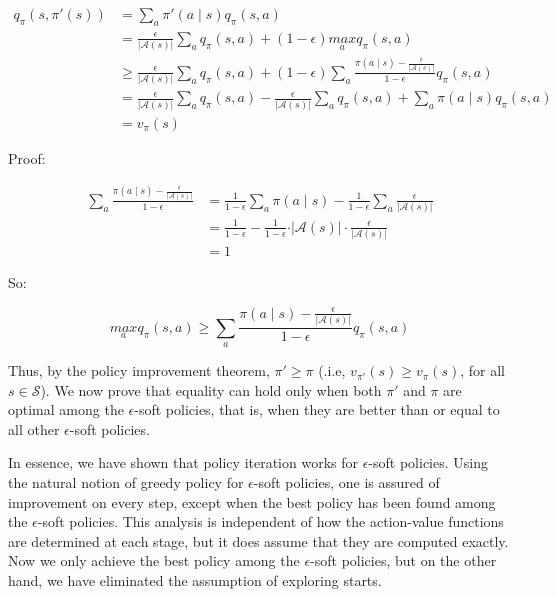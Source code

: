 \documentclass{article}
\begin{document}
\begin{equation*}
\begin{split}
q_{\pi}(s, \pi'(s))
& = \sum_{a} \pi'(a \mid s) q_{\pi}(s, a) \\
& = \frac{\epsilon}{\vert \mathcal{A}(s) \vert} \sum_{a} q_{\pi}(s, a) + (1 - \epsilon) \underset{a}{max} q_{\pi}(s, a) \\
& \geq \frac{\epsilon}{\vert \mathcal{A}(s) \vert} \sum_{a} q_{\pi}(s, a) + (1 - \epsilon) \sum_{a} \frac{\pi(a \mid s) - \frac{\epsilon}{\vert \mathcal{A}(s) \vert}}{1 - \epsilon} q_{\pi}(s, a) \\
& = \frac{\epsilon}{\vert \mathcal{A}(s) \vert} \sum_{a} q_{\pi}(s, a) -  \frac{\epsilon}{\vert \mathcal{A}(s) \vert} \sum_{a} q_{\pi}(s, a) + \sum_{a} \pi(a \mid s) q_{\pi}(s, a) \\
& = v_{\pi}(s)
\end{split}
\end{equation*}

Proof:

\begin{equation*}
\begin{split}
\sum_{a} \frac{\pi(a \mid s) - \frac{\epsilon}{\vert \mathcal{A}(s) \vert}}{1 - \epsilon}
& = \frac{1}{1 - \epsilon} \sum_{a} \pi(a \mid s) - \frac{1}{1 - \epsilon} \sum_{a} \frac{\epsilon}{\vert \mathcal{A}(s) \vert} \\
& = \frac{1}{1 - \epsilon} - \frac{1}{1 - \epsilon} \cdot \vert \mathcal{A}(s) \vert \cdot \frac{\epsilon}{\vert \mathcal{A}(s) \vert} \\
& = 1
\end{split}
\end{equation*}

So:

\[\underset{a}{max} q_{\pi}(s, a) \geq \sum_{a} \frac{\pi(a \mid s) - \frac{\epsilon}{\vert \mathcal{A}(s) \vert}}{1 - \epsilon} q_{\pi}(s, a)\]

Thus, by the policy improvement theorem, \(\pi' \geq \pi\) (.i.e, \(v_{\pi'}(s) \geq v_{\pi}(s)\), for all \(s \in \mathcal{S}\)).
We now prove that equality can hold only when both \(\pi'\) and \(\pi\) are optimal among the \(\epsilon\)-soft
policies, that is, when they are better than or equal to all other \(\epsilon\)-soft policies.

In essence, we have shown that policy iteration works for \(\epsilon\)-soft policies. Using the natural notion of greedy policy for \(\epsilon\)-soft policies, 
one is assured of improvement on every step, except when the best policy has been found among the \(\epsilon\)-soft policies. 
This analysis is independent of how the action-value functions are determined at each stage, but it does assume that they are computed exactly. 
Now we only achieve the best policy among the \(\epsilon\)-soft policies, but on the other hand, we have eliminated the assumption of exploring starts.
\end{document}
